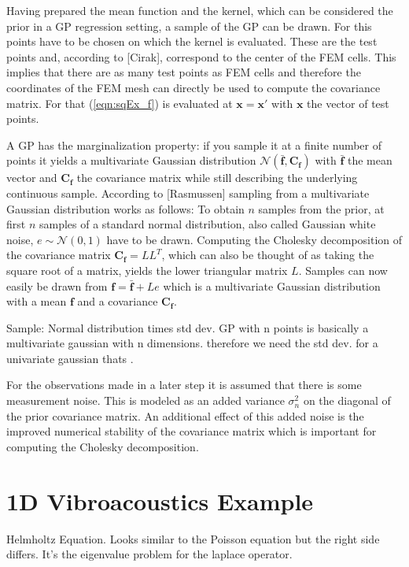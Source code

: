 \documentclass[%
  a4paper,oneside,%
  11pt,%
  smallchapters,
  green,%
  rgb, <cmyk>
  ,]{tubsbook}
\begin{document}
Having prepared the mean function and the kernel, which can be considered the prior in a GP regression setting, a sample of the GP can be drawn. For this points have to be chosen on which the kernel is evaluated. These are the test points and, according to [Cirak], correspond to the center of the FEM cells. This implies that there are as many test points as FEM cells and therefore the coordinates of the FEM mesh can directly be used to compute the covariance matrix. For that (\ref{eqn:sqEx_f}) is evaluated at $\bm{x} = \bm{x}'$ with $\bm{x}$ the vector of test points. 

A GP has the marginalization property: if you sample it at a finite number of points it yields a multivariate Gaussian distribution $\mathcal{N}(\bar{\bm{f}},\bm{C_f})$ with $\bar{\bm{f}}$ the mean vector and $\bm{C_f}$ the covariance matrix while still describing the underlying continuous sample.
According to [Rasmussen] sampling from a multivariate Gaussian distribution works as follows: To obtain $n$ samples from the prior, at first $n$ samples of a standard normal distribution, also called Gaussian white noise, $e \sim \mathcal{N}(0,1)$ have to be drawn. Computing the Cholesky decomposition of the covariance matrix $\bm{C_f} = LL^T$, which can also be thought of as taking the square root of a matrix, yields the lower triangular matrix $L$. Samples can now easily be drawn from $\bm{f} = \bar{\bm{f}} + Le$ which is a multivariate Gaussian distribution with a mean $\bm{f}$ and a covariance $\bm{C_f}$.

Sample: Normal distribution times std dev. GP with n points is basically a multivariate gaussian with n dimensions. therefore we need the std dev. for a univariate gaussian thats . 

For the observations made in a later step it is assumed that there is some measurement noise. This is modeled as an added variance $\sigma_{n}^2$ on the diagonal of the prior covariance matrix. An additional effect of this added noise is the improved numerical stability of the covariance matrix which is important for computing the Cholesky decomposition.

\section{1D Vibroacoustics Example}
Helmholtz Equation. Looks similar to the Poisson equation but the right side differs. It's the eigenvalue problem for the laplace operator.

\lipsum[2-5] %
\end{document}
